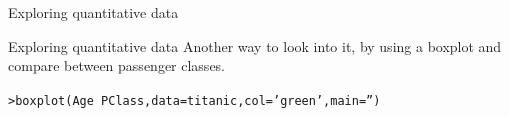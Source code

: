 \documentclass{beamer}\usepackage[]{graphicx}\usepackage[]{color}
\makeatletter
\newcommand{\hlstr}[1]{\textcolor[rgb]{1,0.894,0.71}{#1}}%
\newcommand{\hlopt}[1]{\textcolor[rgb]{1,0.894,0.769}{#1}}%
\newcommand{\hlstd}[1]{\textcolor[rgb]{1,0.894,0.769}{#1}}%
\newcommand{\hlkwc}[1]{\textcolor[rgb]{0.78,0.941,0.545}{#1}}%
\newcommand{\hlkwd}[1]{\textcolor[rgb]{1,0.78,0.769}{#1}}%
\newenvironment{kframe}{%
 \def\at@end@of@kframe{}%
 \ifinner\ifhmode%
  \def\at@end@of@kframe{\end{minipage}}%
  \begin{minipage}{\columnwidth}%
 \fi\fi%
 \def\FrameCommand##1{\hskip\@totalleftmargin \hskip-\fboxsep
 \colorbox{shadecolor}{##1}\hskip-\fboxsep
     \hskip-\linewidth \hskip-\@totalleftmargin \hskip\columnwidth}%
 \MakeFramed {\advance\hsize-\width
   \@totalleftmargin\z@ \linewidth\hsize
   \@setminipage}}%
 {\par\unskip\endMakeFramed%
 \at@end@of@kframe}
\newenvironment{knitrout}{}{} %
\makeatother
\begin{document}
\begin{darkframes}
\begin{frame}[fragile]{Exploring quantitative data}
\begin{knitrout}
\end{knitrout}
      
    \end{frame}
    
    
        \begin{frame}[fragile]{Exploring quantitative data}
      \fontsize{10}{10}\selectfont
      Another way to look into it, by using a boxplot and compare between passenger classes.
      
\begin{knitrout}
\begin{kframe}
\begin{alltt}
\hlstd{> }\hlkwd{boxplot}\hlstd{(Age} \hlopt{~} \hlstd{PClass,} \hlkwc{data}\hlstd{=titanic,} \hlkwc{col}\hlstd{=}\hlstr{'green'}\hlstd{,} \hlkwc{main}\hlstd{=}\hlstr{''}\hlstd{)}
\end{alltt}
\end{kframe}


\end{knitrout}
      
    \end{frame}
    
    
    

  \end{darkframes}
\end{document}

